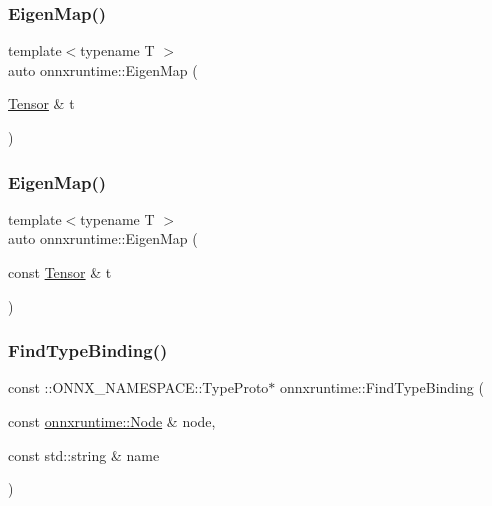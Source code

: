 \mbox{\label{namespaceonnxruntime_a169973fbaa6abc3078b653196d9ee1d5}} 
\subsubsection{\texorpdfstring{Eigen\+Map()}{EigenMap()}\hspace{0.1cm}{\footnotesize\ttfamily [1/2]}}
{\footnotesize\ttfamily template$<$typename T $>$ \\
auto onnxruntime\+::\+Eigen\+Map (\begin{DoxyParamCaption}\item[{\mbox{\hyperlink{classonnxruntime_1_1Tensor}{Tensor}} \&}]{t }\end{DoxyParamCaption})}

\mbox{\label{namespaceonnxruntime_a39960da40fa8bf47e6d341a5c640df43}} 
\subsubsection{\texorpdfstring{Eigen\+Map()}{EigenMap()}\hspace{0.1cm}{\footnotesize\ttfamily [2/2]}}
{\footnotesize\ttfamily template$<$typename T $>$ \\
auto onnxruntime\+::\+Eigen\+Map (\begin{DoxyParamCaption}\item[{const \mbox{\hyperlink{classonnxruntime_1_1Tensor}{Tensor}} \&}]{t }\end{DoxyParamCaption})}

\mbox{\label{namespaceonnxruntime_aa5c39b54b5f2f0b4c9340b8a1899c7ff}} 
\subsubsection{\texorpdfstring{Find\+Type\+Binding()}{FindTypeBinding()}}
{\footnotesize\ttfamily const \+::O\+N\+N\+X\+\_\+\+N\+A\+M\+E\+S\+P\+A\+C\+E\+::\+Type\+Proto$\ast$ onnxruntime\+::\+Find\+Type\+Binding (\begin{DoxyParamCaption}\item[{const \mbox{\hyperlink{classonnxruntime_1_1Node}{onnxruntime\+::\+Node}} \&}]{node,  }\item[{const std\+::string \&}]{name }\end{DoxyParamCaption})}

